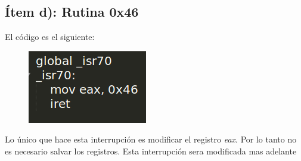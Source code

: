 \subsection{Ítem d): Rutina 0x46}


El código es el siguiente:

\begin{figure}[H]
\begin{center}
  \includegraphics[width=\linewidth]{ejercicio5/rutina0x46.png}
\endminipage
\end{center}
\end{figure}

Lo único que hace esta interrupción es modificar el registro \textit{eax}. Por lo tanto no es necesario salvar los registros. Esta interrupción sera modificada mas adelante